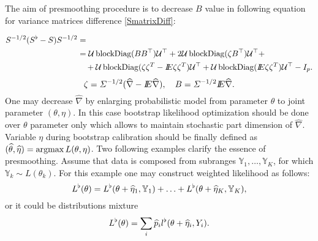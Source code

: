 	



\usepackage{flowchart}
\usetikzlibrary{arrows}

\usepackage{natbib}






The aim of presmoothing procedure is to decrease $B$ value in following equation for variance matrices difference \ref{SmatrixDiff}: 

\begin{align*}
S^{-1/2} (S^{\flat} - S) S^{-1/2} &=\\
 &=\mathcal{U} \operatorname{blockDiag}(BB^{\top})\mathcal{U}^{\top} + 2\mathcal{U} \operatorname{blockDiag}(\zeta B^{\top})\mathcal{U}^{\top} +\\
 &\quad+ \mathcal{U} \operatorname{blockDiag}(\zeta \zeta^{T}   -  I\!\!E \zeta \zeta^{T}) \mathcal{U}^{\top} + \mathcal{U} \operatorname{blockDiag}(I\!\!E \zeta \zeta^{T}) \mathcal{U}^{\top}  - I_{p}.
\end{align*}  
\[
\zeta =  \varSigma^{-1/2} ( \widehat{\nabla} -  I\!\!E \widehat{\nabla} ), 
\quad
B = \varSigma^{-1/2} I\!\!E \widehat{\nabla}.
\]
One may decrease $\widehat{\nabla}$ by enlarging probabilistic model from parameter $\theta$ to joint parameter $(\theta, \eta)$. In this case bootstrap likelihood optimization should be done over $\theta$ parameter only which allows to maintain stochastic part dimension of $\widehat{\nabla}$. Variable $\eta$ during bootstrap calibration should be finally defined as $(\opttheta, \opteta) = \argmax L(\theta, \eta)$.   Two following examples clarify the essence of presmoothing. Assume that data is composed from subranges $\mathbb{Y}_1,\ldots,\mathbb{Y}_K$, for which $\mathbb{Y}_k \sim L(\theta_k)$. For this example one may construct weighted likelihood as follows:
\[
L^{\flat}(\theta)  = L^{\flat}(\theta + \widehat{\eta}_1, \mathbb{Y}_1) + \ldots + L^{\flat}(\theta + \widehat{\eta}_K, \mathbb{Y}_K), 
\]   
or it could be distributions mixture
\[
L^{\flat}(\theta)  = \sum_{i} \widehat{p}_i l^{\flat}  (\theta + \widehat{\eta}_i, Y_i). 
\] 

